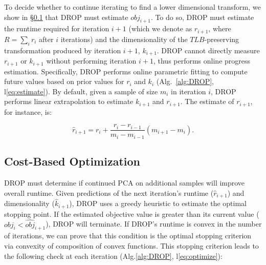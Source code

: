 To decide whether to continue iterating to find a lower dimensional transform, we show in  \S\ref{subsec:opt} that DROP must estimate $obj_{i+1}$. To do so, DROP must estimate the runtime required for iteration $i+1$ (which we denote as $r_{i+1}$, where $R=\sum_i r_i$ after $i$ iterations) and the dimensionality of the $TLB$-preserving transformation produced by iteration $i+1$, $k_{i+1}$. 
DROP cannot directly measure $r_{i+1}$ or $k_{i+1}$ without performing iteration $i+1$, thus performs online progress estimation. Specifically, DROP performs online parametric fitting to compute future values based on prior values for $r_{i}$ and $k_i$ (Alg.~\ref{alg:DROP}, l\ref{eq:estimate}). 
By default, given a sample of size $m_i$ in iteration $i$, DROP performs linear extrapolation to estimate $k_{i+1}$ and $r_{i+1}$. The estimate of $r_{i+1}$, for instance, is:

\vspace{-.4cm}
\begin{equation*}
\hat{r}_{i+1} = r_i + \frac{r_i - r_{i-1}}{m_i - m_{i-1}} (m_{i+1} -  m_i).
\end{equation*}

\subsection{Cost-Based Optimization}
\label{subsec:opt}

DROP must determine if continued PCA on additional samples will improve overall runtime. 
Given predictions of the next iteration's runtime ($\hat{r}_{i+1}$) and dimensionality ($\hat{k}_{i+1}$), DROP uses a greedy heuristic to estimate the optimal stopping point.
If the estimated objective value is greater than its current value ($obj_i < \widehat{obj}_{i+1}$), DROP will terminate. 
If DROP's runtime is convex in the number of iterations, we can prove that this condition is the optimal stopping criterion via convexity of composition of convex functions. 
This stopping criterion leads to the following check at each iteration (Alg.\ref{alg:DROP}, l\ref{eq:optimize}): 

